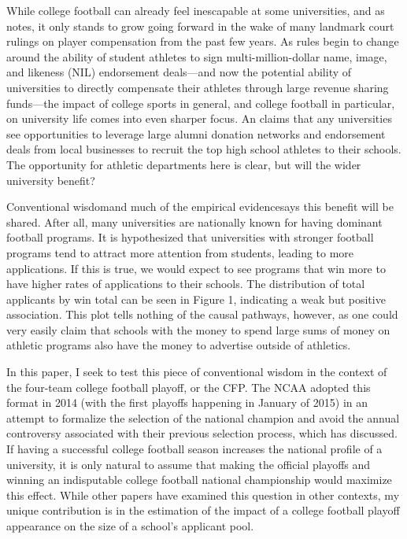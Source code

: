 \documentclass[12pt,english]{article}
\begin{document}
While college football can already feel inescapable at some universities, and as \citet{Williams24} notes, it only stands to grow going forward in the wake of many landmark court rulings on player compensation from the past few years. As rules begin to change around the ability of student athletes to sign multi-million-dollar name, image, and likeness (NIL) endorsement deals—and now the potential ability of universities to directly compensate their athletes through large revenue sharing funds—the impact of college sports in general, and college football in particular, on university life comes into even sharper focus. An \cite{On3NIL} claims that any universities see opportunities to leverage large alumni donation networks and endorsement deals from local businesses to recruit the top high school athletes to their schools. The opportunity for athletic departments here is clear, but will the wider university benefit?

Conventional wisdom\textemdash and much of the empirical evidence\textemdash says this benefit will be shared. After all, many universities are nationally known for having dominant football programs. It is hypothesized that universities with stronger football programs tend to attract more attention from students, leading to more applications. If this is true, we would expect to see programs that win more to have higher rates of applications to their schools. The distribution of total applicants by win total can be seen in Figure 1, indicating a weak but positive association. This plot tells nothing of the causal pathways, however, as one could very easily claim that schools with the money to spend large sums of money on athletic programs also have the money to advertise outside of athletics.


In this paper, I seek to test this piece of conventional wisdom in the context of the four-team college football playoff, or the CFP. The NCAA adopted this format in 2014 (with the first playoffs happening in January of 2015) in an attempt to formalize the selection of the national champion and avoid the annual controversy associated with their previous selection process, which \citet{staples14} has discussed. If having a successful college football season increases the national profile of a university, it is only natural to assume that making the official playoffs and winning an indisputable college football national championship would maximize this effect. While other papers have examined this question in other contexts, my unique contribution is in the estimation of the impact of a college football playoff appearance on the size of a school’s applicant pool. 
\end{document}
